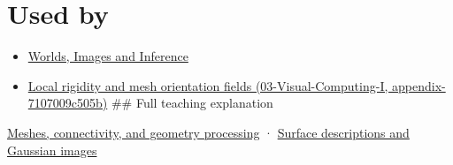 \section{Used by}\label{appendix-0234ab7f86b1-used-by}

\begin{itemize}
\item
  \href{Continuous\%20Notes/University\%20-\%20Worlds,\%20Images\%20and\%20Inference\%20-\%20Graphics,\%20Vision\%20and\%20Photography}{Worlds, Images and Inference}
\item
  \href{../03-Visual-Computing-I/main.pdf\#nameddest=appendix-7107009c505b}{Local rigidity and mesh orientation fields (03-Visual-Computing-I, appendix-7107009c505b)} \#\# Full teaching explanation
\end{itemize}

\href{Continuous\%20Notes/University\%20-\%20Worlds,\%20Images\%20and\%20Inference\%20-\%20Graphics,\%20Vision\%20and\%20Photography\#Meshes,\%20connectivity,\%20and\%20geometry\%20processing}{Meshes, connectivity, and geometry processing} · \href{Continuous\%20Notes/University\%20-\%20Worlds,\%20Images\%20and\%20Inference\%20-\%20Graphics,\%20Vision\%20and\%20Photography\#Surface\%20descriptions\%20and\%20Gaussian\%20images}{Surface descriptions and Gaussian images}
